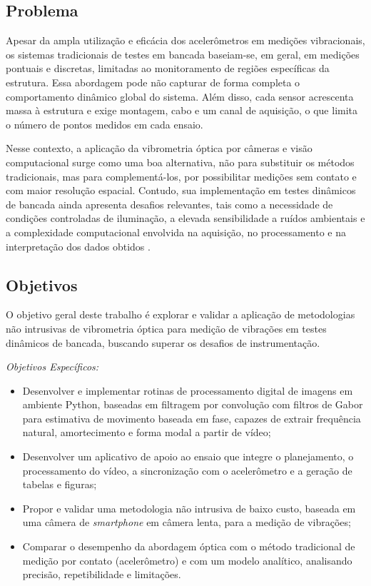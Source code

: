 \documentclass[a4paper,10pt,twocolumn]{article}
\begin{document}
\subsection{Problema}
Apesar da ampla utilização e eficácia dos acelerômetros em medições vibracionais, os sistemas tradicionais de testes em bancada baseiam-se, em geral, em medições pontuais e discretas, limitadas ao monitoramento de regiões específicas da estrutura. Essa abordagem pode não capturar de forma completa o comportamento dinâmico global do sistema. Além disso, cada sensor acrescenta massa à estrutura e exige montagem, cabo e um canal de aquisição, o que limita o número de pontos medidos em cada ensaio.

Nesse contexto, a aplicação da vibrometria óptica por câmeras e visão computacional surge como uma boa alternativa, não para substituir os métodos tradicionais, mas para complementá-los, por possibilitar medições sem contato e com maior resolução espacial. Contudo, sua implementação em testes dinâmicos de bancada ainda apresenta desafios relevantes, tais como a necessidade de condições controladas de iluminação, a elevada sensibilidade a ruídos ambientais e a complexidade computacional envolvida na aquisição, no processamento e na interpretação dos dados obtidos \cite{Phase2022}.

\subsection{Objetivos}

O objetivo geral deste trabalho é explorar e validar a aplicação de metodologias não intrusivas de vibrometria óptica para medição de vibrações em testes dinâmicos de bancada, buscando superar os desafios de instrumentação.

\noindent\textit{Objetivos Específicos:}
\begin{itemize}
    \item Desenvolver e implementar rotinas de processamento digital de imagens em ambiente Python, baseadas em filtragem por convolução com filtros de Gabor para estimativa de movimento baseada em fase, capazes de extrair frequência natural, amortecimento e forma modal a partir de vídeo;
    \item Desenvolver um aplicativo de apoio ao ensaio que integre o planejamento, o processamento do vídeo, a sincronização com o acelerômetro e a geração de tabelas e figuras;
    \item Propor e validar uma metodologia não intrusiva de baixo custo, baseada em uma câmera de \textit{smartphone} em câmera lenta, para a medição de vibrações;
    \item Comparar o desempenho da abordagem óptica com o método tradicional de medição por contato (acelerômetro) e com um modelo analítico, analisando precisão, repetibilidade e limitações.
\end{itemize}
\end{document}
